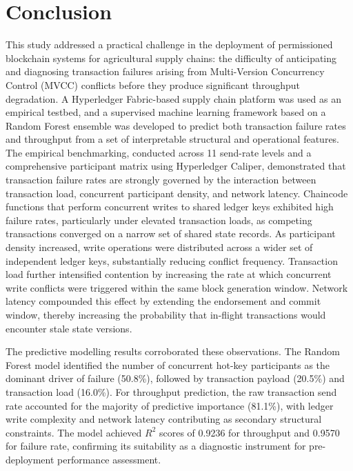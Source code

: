 \documentclass[12pt]{article}
\begin{document}
\section{Conclusion}

This study addressed a practical challenge in the deployment of permissioned blockchain systems for agricultural supply chains: the difficulty of anticipating and diagnosing transaction failures arising from Multi-Version Concurrency Control (MVCC) conflicts before they produce significant throughput degradation. A Hyperledger Fabric-based supply chain platform was used as an empirical testbed, and a supervised machine learning framework based on a Random Forest ensemble was developed to predict both transaction failure rates and throughput from a set of interpretable structural and operational features. The empirical benchmarking, conducted across 11 send-rate levels and a comprehensive participant matrix using Hyperledger Caliper, demonstrated that transaction failure rates are strongly governed by the interaction between transaction load, concurrent participant density, and network latency. Chaincode functions that perform concurrent writes to shared ledger keys exhibited high failure rates, particularly under elevated transaction loads, as competing transactions converged on a narrow set of shared state records. As participant density increased, write operations were distributed across a wider set of independent ledger keys, substantially reducing conflict frequency. Transaction load further intensified contention by increasing the rate at which concurrent write conflicts were triggered within the same block generation window. Network latency compounded this effect by extending the endorsement and commit window, thereby increasing the probability that in-flight transactions would encounter stale state versions.

The predictive modelling results corroborated these observations. The Random Forest model identified the number of concurrent hot-key participants as the dominant driver of failure (50.8\%), followed by transaction payload (20.5\%) and transaction load (16.0\%). For throughput prediction, the raw transaction send rate accounted for the majority of predictive importance (81.1\%), with ledger write complexity and network latency contributing as secondary structural constraints. The model achieved $R^2$ scores of 0.9236 for throughput and 0.9570 for failure rate, confirming its suitability as a diagnostic instrument for pre-deployment performance assessment.
\end{document}
